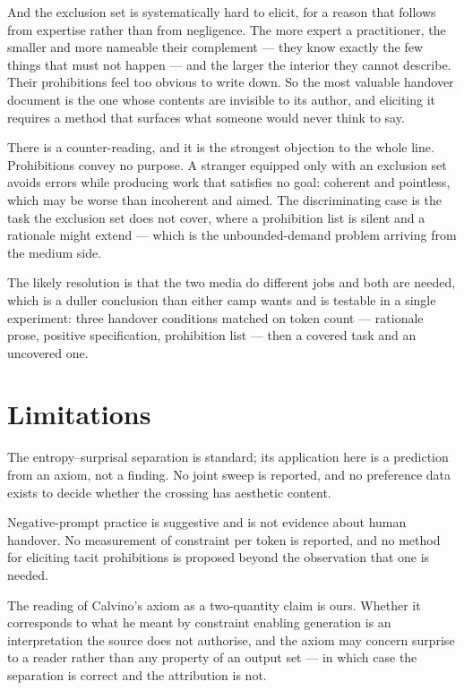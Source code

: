 \documentclass[11pt,a4paper]{article}
\begin{document}
And the exclusion set is systematically hard to elicit, for a reason that follows from expertise rather than from negligence. The more expert a practitioner, the smaller and more nameable their complement --- they know exactly the few things that must not happen --- and the larger the interior they cannot describe. Their prohibitions feel too obvious to write down. So the most valuable handover document is the one whose contents are invisible to its author, and eliciting it requires a method that surfaces what someone would never think to say.

There is a counter-reading, and it is the strongest objection to the whole line. Prohibitions convey no purpose. A stranger equipped only with an exclusion set avoids errors while producing work that satisfies no goal: coherent and pointless, which may be worse than incoherent and aimed. The discriminating case is the task the exclusion set does not cover, where a prohibition list is silent and a rationale might extend --- which is the unbounded-demand problem arriving from the medium side.

The likely resolution is that the two media do different jobs and both are needed, which is a duller conclusion than either camp wants and is testable in a single experiment: three handover conditions matched on token count --- rationale prose, positive specification, prohibition list --- then a covered task and an uncovered one.

\section{Limitations}
The entropy--surprisal separation is standard; its application here is a prediction from an axiom, not a finding. No joint sweep is reported, and no preference data exists to decide whether the crossing has aesthetic content.

Negative-prompt practice is suggestive and is not evidence about human handover. No measurement of constraint per token is reported, and no method for eliciting tacit prohibitions is proposed beyond the observation that one is needed.

The reading of Calvino's axiom as a two-quantity claim is ours. Whether it corresponds to what he meant by constraint enabling generation is an interpretation the source does not authorise, and the axiom may concern surprise to a reader rather than any property of an output set --- in which case the separation is correct and the attribution is not.
\end{document}
